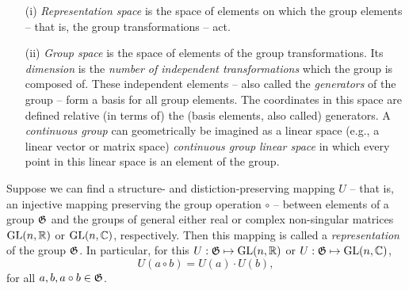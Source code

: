 \begin{itemize}
\item[(i)] {\em Representation space} is the space of elements on which the group elements -- that is, the group transformations -- act.
\item[(ii)]  {\em Group space} is the space of elements of the group transformations.
Its {\em dimension} is the {\em number of independent transformations} which the group is composed of.
These independent elements -- also called the {\em generators} of the group -- form a basis for all group elements.
The coordinates in this space are defined relative (in terms of) the (basis elements, also called) generators.
A {\em continuous group} can geometrically be imagined as a linear  space  (e.g., a linear vector or matrix space)
{\em continuous group}
{\em linear space}
in which every point in this linear space is an element of the group.
\end{itemize}


Suppose we can find a structure- and distiction-preserving mapping $  U  $ -- that is, an injective mapping preserving the group operation $\circ$  --
between elements of a group ${\frak G}$
and the groups of general either real or complex non-singular  matrices $\textrm{GL}(n,{\Bbb R})$ or $\textrm{GL}(n,{\Bbb C})$, respectively.
Then this mapping is called
a {\em representation}
 of the group ${\frak G}$.
In particular,
for this $  U  : {\frak G} \mapsto  \textrm{GL}(n,{\Bbb R})$ or $  U  : {\frak G} \mapsto \textrm{GL}(n,{\Bbb C})$,
\begin{equation}
  U  (a\circ b)   =   U  (a)\cdot   U  (b),
\end{equation}
for all
$a,b, a\circ b \in {\frak G}$.

